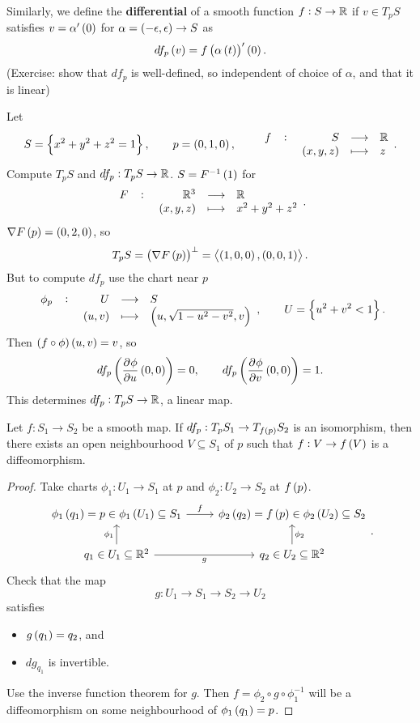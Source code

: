 Similarly, we define the \textbf{differential} of a smooth function $ f : S \to \mathbb{R} $ if $ v \in T_pS $ satisfies $ v = \alpha'\br{0} $ for $ \alpha = \br{-\epsilon, \epsilon} \to S $ as
$$ df_p\br{v} = f\br{\alpha\br{t}}'\br{0}. $$
(Exercise: show that $ df_p $ is well-defined, so independent of choice of $ \alpha $, and that it is linear)


\begin{example*}
Let
$$ S = \cbr{x^2 + y^2 + z^2 = 1}, \qquad p = \br{0, 1, 0}, \qquad \function[f]{S}{\R}{\br{x, y, z}}{z}. $$
Compute $ T_pS $ and $ df_p : T_pS \to \mathbb{R} $. $ S = F^{-1}\br{1} $ for
$$ \function[F]{\R^3}{\R}{\br{x, y, z}}{x^2 + y^2 + z^2}. $$
$ \nabla F\br{p} = \br{0, 2, 0} $, so
$$ T_pS = \br{\nabla F\br{p}}^\perp = \abr{\br{1, 0, 0}, \br{0, 0, 1}}. $$
But to compute $ df_p $ use the chart near $ p $
$$ \function[\phi_p]{U}{S}{\br{u, v}}{\br{u, \sqrt{1 - u^2 - v^2}, v}}, \qquad U = \cbr{u^2 + v^2 < 1}. $$
Then $ \br{f \circ \phi}\br{u, v} = v $, so
$$ df_p\br{\dpd{\phi}{u}\br{0, 0}} = 0, \qquad df_p\br{\dpd{\phi}{v}\br{0, 0}} = 1. $$
This determines $ df_p : T_pS \to \mathbb{R} $, a linear map.
\end{example*}

\begin{proposition}
Let $ f : S_1 \to S_2 $ be a smooth map. If $ df_p : T_pS_1 \to T_{f\br{p}}S_2 $ is an isomorphism, then there exists an open neighbourhood $ V \subseteq S_1 $ of $ p $ such that $ f : V \to f\br{V} $ is a diffeomorphism.
\end{proposition}

\begin{proof}
Take charts $ \phi_1 : U_1 \to S_1 $ at $ p $ and $ \phi_2 : U_2 \to S_2 $ at $ f\br{p} $.
$$
\begin{tikzcd}
\phi_1\br{q_1} = p \in \phi_1\br{U_1} \subseteq S_1 \arrow{r}{f} & \phi_2\br{q_2} = f\br{p} \in \phi_2\br{U_2} \subseteq S_2 \\
q_1 \in U_1 \subseteq \R^2 \arrow{u}{\phi_1} \arrow[swap]{r}{g} & q_2 \in U_2 \subseteq \R^2 \arrow[swap]{u}{\phi_2}
\end{tikzcd}.
$$
Check that the map
$$ g : U_1 \to S_1 \to S_2 \to U_2 $$
satisfies
\begin{itemize}
\item $ g\br{q_1} = q_2 $, and
\item $ dg_{q_1} $ is invertible.
\end{itemize}
Use the inverse function theorem for $ g $. Then $ f = \phi_2 \circ g \circ \phi_1^{-1} $ will be a diffeomorphism on some neighbourhood of $ \phi_1\br{q_1} = p $.
\end{proof}

